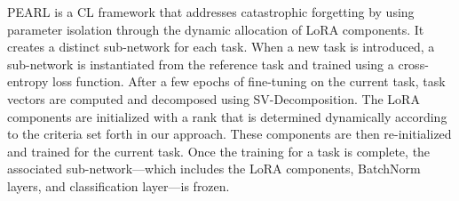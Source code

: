 \documentclass[10pt]{article} %
\begin{document}
\begin{table}[h!]
\caption{Dataset organization across different tasks and settings.}
\centering
{}
\label{tab:dataset_settings}
\end{table}


PEARL is a CL framework that addresses catastrophic forgetting by using parameter isolation through the dynamic allocation of LoRA components. It creates a distinct sub-network for each task. When a new task is introduced, a sub-network is instantiated from the reference task and trained using a cross-entropy loss function. After a few epochs of fine-tuning on the current task, task vectors are computed and decomposed using SV-Decomposition. The LoRA components are initialized with a rank that is determined dynamically according to the criteria set forth in our approach. These components are then re-initialized and trained for the current task. Once the training for a task is complete, the associated sub-network—which includes the LoRA components, BatchNorm layers, and classification layer—is frozen. 

\end{document}
